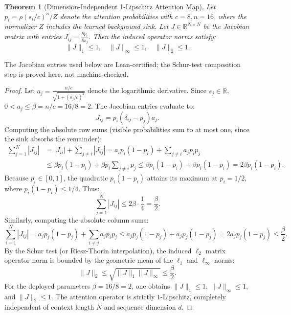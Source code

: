 \documentclass[11pt,a4paper]{article}
\newtheorem{theorem}{Theorem}[section]
\theoremstyle{definition}
\begin{document}
\begin{theorem}[Dimension-Independent 1-Lipschitz Attention Map]
Let $p_i = \rho(s_i / c)^n / Z$ denote the attention probabilities with $c=8, n=16$, where the normalizer $Z$ includes the learned background sink. Let $J \in \mathbb{R}^{N \times N}$ be the Jacobian matrix with entries $J_{ij} = \frac{\partial p_i}{\partial s_j}$. Then the induced operator norms satisfy:
\begin{equation}
\|J\|_1 \le 1, \quad \|J\|_\infty \le 1, \quad \|J\|_2 \le 1.
\end{equation}
\end{theorem}
The Jacobian entries used below are Lean-certified; the Schur-test composition step is proved here, not machine-checked.
\begin{proof}
Let $a_j = \frac{n/c}{\sqrt{1 + (s_j/c)^2}}$ denote the logarithmic derivative. Since $s_j \in \mathbb{R}$, $0 < a_j \le \beta = n/c = 16/8 = 2$. The Jacobian entries evaluate to:
\begin{equation}
J_{ij} = p_i (\delta_{ij} - p_j) a_j.
\end{equation}
Computing the absolute row sums (visible probabilities sum to at most one, since the sink absorbs the remainder):
\begin{align}
\sum_{j=1}^N |J_{ij}| &= |J_{ii}| + \sum_{j \ne i} |J_{ij}| = a_i p_i (1 - p_i) + \sum_{j \ne i} a_j p_i p_j \nonumber \\
&\le \beta p_i (1 - p_i) + \beta p_i \sum_{j \ne i} p_j \le \beta p_i (1 - p_i) + \beta p_i (1 - p_i) = 2 \beta p_i (1 - p_i).
\end{align}
Because $p_i \in [0, 1]$, the quadratic $p_i(1 - p_i)$ attains its maximum at $p_i = 1/2$, where $p_i(1 - p_i) \le 1/4$. Thus:
\begin{equation}
\sum_{j=1}^N |J_{ij}| \le 2 \beta \cdot \frac{1}{4} = \frac{\beta}{2}.
\end{equation}
Similarly, computing the absolute column sums:
\begin{equation}
\sum_{i=1}^N |J_{ij}| = a_j p_j (1 - p_j) + \sum_{i \ne j} a_j p_i p_j \le a_j p_j (1 - p_j) + a_j p_j (1 - p_j) = 2 a_j p_j (1 - p_j) \le \frac{\beta}{2}.
\end{equation}
By the Schur test (or Riesz-Thorin interpolation), the induced $\ell_2$ matrix operator norm is bounded by the geometric mean of the $\ell_1$ and $\ell_\infty$ norms:
\begin{equation}
\|J\|_2 \le \sqrt{\|J\|_1 \|J\|_\infty} \le \frac{\beta}{2}.
\end{equation}
For the deployed parameters $\beta = 16/8 = 2$, one obtains $\|J\|_1 \le 1$, $\|J\|_\infty \le 1$, and $\|J\|_2 \le 1$. The attention operator is strictly $1$-Lipschitz, completely independent of context length $N$ and sequence dimension $d$.
\end{proof}
\end{document}
